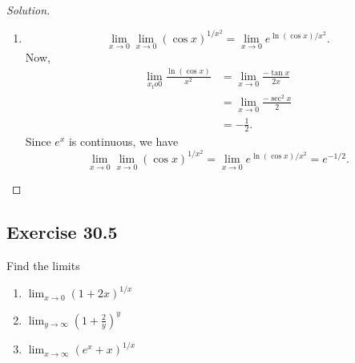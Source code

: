 \documentclass{article}
\begin{document}
\begin{proof}[Solution]
\begin{enumerate}[label=\textbf{(\alph*)}]
        \item 
        $$\lim_{x\to0}\lim_{x\to0}(\cos x)^{1/x^2} = \lim_{x\to0}e^{\ln(\cos x)/x^2}.$$
        Now, \begin{align*}
            \lim_{x_to0}\frac{\ln(\cos x)}{x^2} & = \lim_{x\to0}\frac{-\tan x}{2x} \\
            & = \lim_{x\to0}\frac{-\sec^2 x}{2} \\
            & = -\frac{1}{2}.
        \end{align*}
        Since $e^x$ is continuous, we have
        $$\lim_{x\to0}\lim_{x\to0}(\cos x)^{1/x^2} = \lim_{x\to0}e^{\ln(\cos x)/x^2} = e^{-1/2}.$$
    \end{enumerate}    
\end{proof}


\newpage
\subsection*{Exercise 30.5}
Find the limits
\begin{enumerate}[label=\textbf{(\alph*)}]
    \item $\lim_{x\to0}(1+2x)^{1/x}$
    \item $\lim_{y\to\infty}(1+\frac{2}{y})^y$
    \item $\lim_{x\to\infty}(e^x+x)^{1/x}$
\end{enumerate}
\end{document}
